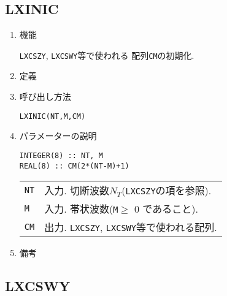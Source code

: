 \documentclass[a4j]{jarticle}
\begin{document}
\subsection{LXINIC}

\begin{enumerate}

\item 機能
  
\texttt{LXCSZY}, \texttt{LXCSWY}等で使われる
配列\texttt{CM}の初期化.

\item 定義

\item 呼び出し方法 
    
\texttt{LXINIC(NT,M,CM)}
  
\item パラメーターの説明

\begin{verbatim}
INTEGER(8) :: NT, M
REAL(8) :: CM(2*(NT-M)+1)
\end{verbatim}
      
\begin{tabular}{ll}
\texttt{NT} & 入力. 切断波数$N_T$(\texttt{LXCSZY}の項を参照).\\
\texttt{M} & 入力. 帯状波数(\texttt{M}$\ge$ 0 であること).\\
\texttt{CM}  & 出力. \texttt{LXCSZY}, \texttt{LXCSWY}等で使われる配列.
\end{tabular}

\item 備考

\end{enumerate}

\subsection{LXCSWY}
\end{document}
